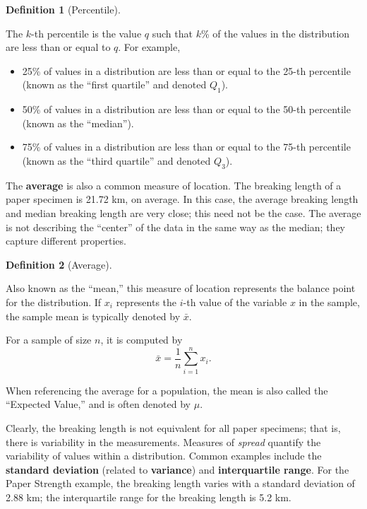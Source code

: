 \documentclass[
  letterpaper,
  DIV=11,
  numbers=noendperiod]{scrreprt}
\providecommand{\tightlist}{%
  \setlength{\itemsep}{0pt}\setlength{\parskip}{0pt}}\usepackage{longtable,booktabs,array}
\theoremstyle{definition}
\theoremstyle{definition}
\newtheorem{definition}{Definition}[chapter]
\theoremstyle{plain}
\theoremstyle{remark}
\begin{document}
\begin{definition}[Percentile]\protect\hypertarget{def-percentile}{}\label{def-percentile}

The \(k\)-th percentile is the value \(q\) such that \(k\)\% of the
values in the distribution are less than or equal to \(q\). For example,

\begin{itemize}
\tightlist
\item
  25\% of values in a distribution are less than or equal to the 25-th
  percentile (known as the ``first quartile'' and denoted \(Q_1\)).
\item
  50\% of values in a distribution are less than or equal to the 50-th
  percentile (known as the ``median'').
\item
  75\% of values in a distribution are less than or equal to the 75-th
  percentile (known as the ``third quartile'' and denoted \(Q_3\)).
\end{itemize}

\end{definition}

The \textbf{average} is also a common measure of location. The breaking
length of a paper specimen is 21.72 km, on average. In this case, the
average breaking length and median breaking length are very close; this
need not be the case. The average is not describing the ``center'' of
the data in the same way as the median; they capture different
properties.

\begin{definition}[Average]\protect\hypertarget{def-average}{}\label{def-average}

Also known as the ``mean,'' this measure of location represents the
balance point for the distribution. If \(x_i\) represents the \(i\)-th
value of the variable \(x\) in the sample, the sample mean is typically
denoted by \(\bar{x}\).

For a sample of size \(n\), it is computed by
\[\bar{x} = \frac{1}{n}\sum_{i=1}^{n} x_i.\]

When referencing the average for a population, the mean is also called
the ``Expected Value,'' and is often denoted by \(\mu\).

\end{definition}

Clearly, the breaking length is not equivalent for all paper specimens;
that is, there is variability in the measurements. Measures of
\emph{spread} quantify the variability of values within a distribution.
Common examples include the \textbf{standard deviation} (related to
\textbf{variance}) and \textbf{interquartile range}. For the Paper
Strength example, the breaking length varies with a standard deviation
of 2.88 km; the interquartile range for the breaking length is 5.2 km.
\end{document}
